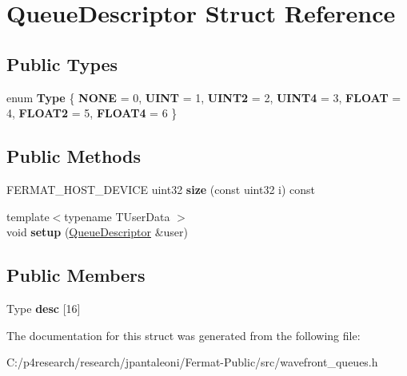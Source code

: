 \hypertarget{struct_queue_descriptor}{}\section{Queue\+Descriptor Struct Reference}
\label{struct_queue_descriptor}
\subsection*{Public Types}
\begin{DoxyCompactItemize}
\item 
\mbox{\label{struct_queue_descriptor_acc856082e52d5375413fc3d839808790}} 
enum {\bfseries Type} \{ \newline
{\bfseries N\+O\+NE} = 0, 
{\bfseries U\+I\+NT} = 1, 
{\bfseries U\+I\+N\+T2} = 2, 
{\bfseries U\+I\+N\+T4} = 3, 
\newline
{\bfseries F\+L\+O\+AT} = 4, 
{\bfseries F\+L\+O\+A\+T2} = 5, 
{\bfseries F\+L\+O\+A\+T4} = 6
 \}
\end{DoxyCompactItemize}
\subsection*{Public Methods}
\begin{DoxyCompactItemize}
\item 
\mbox{\label{struct_queue_descriptor_a7b601f97ab68c3d2fa0785d33220acd8}} 
F\+E\+R\+M\+A\+T\+\_\+\+H\+O\+S\+T\+\_\+\+D\+E\+V\+I\+CE uint32 {\bfseries size} (const uint32 i) const
\item 
\mbox{\label{struct_queue_descriptor_a30b7eea2f2b4dc110ac5a1a0f6d77d11}} 
{\footnotesize template$<$typename T\+User\+Data $>$ }\\void {\bfseries setup} (\hyperlink{struct_queue_descriptor}{Queue\+Descriptor} \&user)
\end{DoxyCompactItemize}
\subsection*{Public Members}
\begin{DoxyCompactItemize}
\item 
\mbox{\label{struct_queue_descriptor_a40181177a2a9da102621a5023a4af5e3}} 
Type {\bfseries desc} \mbox{[}16\mbox{]}
\end{DoxyCompactItemize}


The documentation for this struct was generated from the following file\+:\begin{DoxyCompactItemize}
\item 
C\+:/p4research/research/jpantaleoni/\+Fermat-\/\+Public/src/wavefront\+\_\+queues.\+h\end{DoxyCompactItemize}
